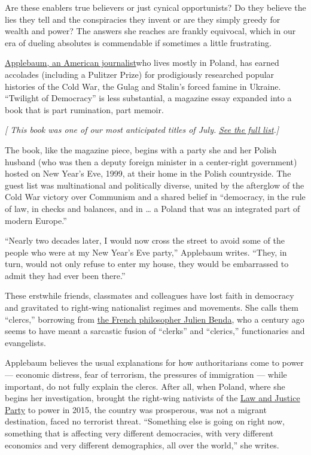 Are these enablers true believers or just cynical opportunists? Do they
believe the lies they tell and the conspiracies they invent or are they
simply greedy for wealth and power? The answers she reaches are frankly
equivocal, which in our era of dueling absolutes is commendable if
sometimes a little frustrating.

\href{https://www.anneapplebaum.com}{Applebaum, an American
journalist}who lives mostly in Poland, has earned accolades (including a
Pulitzer Prize) for prodigiously researched popular histories of the
Cold War, the Gulag and Stalin's forced famine in Ukraine. ``Twilight of
Democracy'' is less substantial, a magazine essay expanded into a book
that is part rumination, part memoir.

\emph{{[} This book was one of our most anticipated titles of July.}
\href{https://www.nytimes3xbfgragh.onion/2020/06/24/books/new-july-books.html}{\emph{See
the full list}}\emph{.{]}}

The book, like the magazine piece, begins with a party she and her
Polish husband (who was then a deputy foreign minister in a center-right
government) hosted on New Year's Eve, 1999, at their home in the Polish
countryside. The guest list was multinational and politically diverse,
united by the afterglow of the Cold War victory over Communism and a
shared belief in ``democracy, in the rule of law, in checks and
balances, and in \ldots{} a Poland that was an integrated part of modern
Europe.''

``Nearly two decades later, I would now cross the street to avoid some
of the people who were at my New Year's Eve party,'' Applebaum writes.
``They, in turn, would not only refuse to enter my house, they would be
embarrassed to admit they had ever been there.''

These erstwhile friends, classmates and colleagues have lost faith in
democracy and gravitated to right-wing nationalist regimes and
movements. She calls them ``clercs,'' borrowing from
\href{https://www.britannica.com/biography/Julien-Benda}{the French
philosopher Julien Benda}, who a century ago seems to have meant a
sarcastic fusion of ``clerks'' and ``clerics,'' functionaries and
evangelists.

Applebaum believes the usual explanations for how authoritarians come to
power --- economic distress, fear of terrorism, the pressures of
immigration --- while important, do not fully explain the clercs. After
all, when Poland, where she begins her investigation, brought the
right-wing nativists of the
\href{https://foreignpolicy.com/2019/10/11/pis-centuries-old-divides-polands-east-west-elections/}{Law
and Justice Party} to power in 2015, the country was prosperous, was not
a migrant destination, faced no terrorist threat. ``Something else is
going on right now, something that is affecting very different
democracies, with very different economics and very different
demographics, all over the world,'' she writes.

